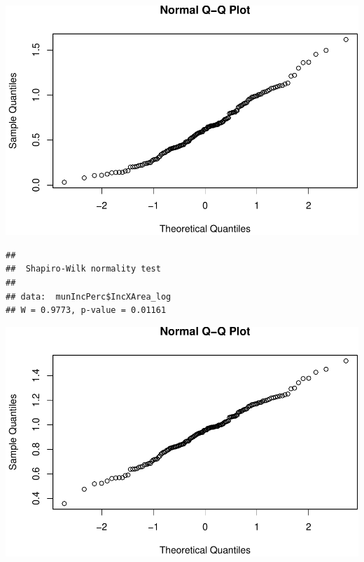 \documentclass[11pt,]{article}
\newenvironment{Shaded}{\begin{snugshade}}{\end{snugshade}}
\newcommand{\KeywordTok}[1]{\textcolor[rgb]{0.13,0.29,0.53}{\textbf{#1}}}
\newcommand{\OperatorTok}[1]{\textcolor[rgb]{0.81,0.36,0.00}{\textbf{#1}}}
\newcommand{\NormalTok}[1]{#1}
\begin{document}
\includegraphics{proyecto_files/figure-latex/unnamed-chunk-27-2.pdf}

\begin{Shaded}
\end{Shaded}

\begin{verbatim}
## 
##  Shapiro-Wilk normality test
## 
## data:  munIncPerc$IncXArea_log
## W = 0.9773, p-value = 0.01161
\end{verbatim}

\begin{Shaded}
\end{Shaded}

\includegraphics{proyecto_files/figure-latex/unnamed-chunk-27-3.pdf}
\end{document}
